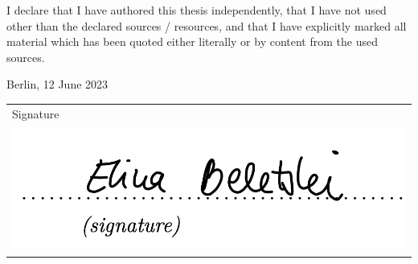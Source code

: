 \newpage
\thispagestyle{empty}

\begin{large}

\vspace*{2cm}

\noindent
I declare that I have authored this thesis independently, that I have not used other than the declared
sources / resources, and that I have explicitly marked all material which has been quoted either
literally or by content from the used sources. 

\vspace{2cm}

\noindent
Berlin, 12 June 2023
\vspace{3cm}

\hspace*{\fill}
\begin{tabular}{l}  %
Signature \\[1ex]
\includegraphics[scale=0.5]{Pictures/signature.png}
\end{tabular}
\end{large}
